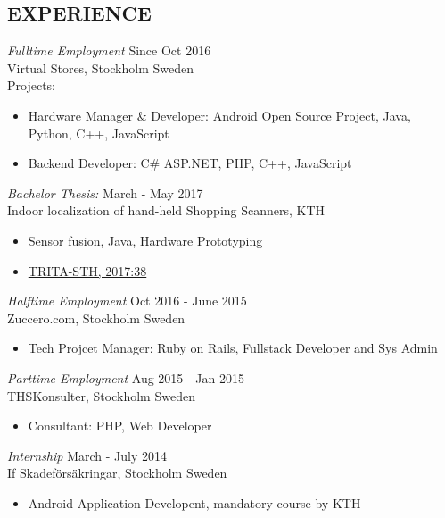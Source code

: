 \documentclass[margin]{res}
\begin{document}
\begin{resume}
 
\section{EXPERIENCE}
{\sl Fulltime Employment } \hfill Since Oct 2016 \\
                Virtual Stores, Stockholm Sweden \\ 
                Projects:
                \begin{itemize} \itemsep -3pt

                \item Hardware Manager \& Developer:  Android Open Source Project, Java, Python, C++, JavaScript\hfill 
                \item Backend Developer:  C\# ASP.NET, PHP, C++, JavaScript\hfill 
                \end{itemize}
{\sl Bachelor Thesis: } \hfill March - May 2017\\
Indoor localization of hand-held Shopping Scanners, KTH
 \begin{itemize} \itemsep -3pt
                \item Sensor fusion, Java, Hardware Prototyping \hfill 
                \item \href{http://kth.diva-portal.org/smash/record.jsf?pid=diva2\%3A1108974}{TRITA-STH, 2017:38} \hfill 
                \end{itemize}

{\sl Halftime Employment } \hfill  Oct 2016 - June 2015 \\
                Zuccero.com, Stockholm Sweden
                 \begin{itemize}  \itemsep -3pt %
                 \item  Tech Projcet Manager: Ruby on Rails, Fullstack Developer and Sys Admin\hfill 
                \end{itemize}
{\sl Parttime Employment } \hfill  Aug 2015 - Jan 2015 \\
                THSKonsulter, Stockholm Sweden
                 \begin{itemize}  \itemsep -3pt %
                 \item  Consultant: PHP, Web Developer\hfill 
                \end{itemize}
    {\sl Internship } \hfill March - July 2014 \\
                If Skadeförsäkringar, Stockholm Sweden
                 \begin{itemize}  \itemsep -3pt %
                 \item Android Application Developent, mandatory course by KTH 
                \end{itemize}        



\end{resume}
\end{document}
